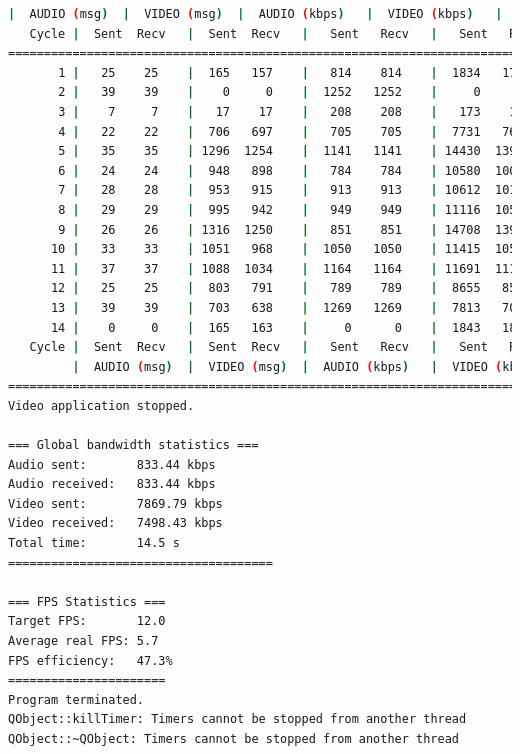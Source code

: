\begin{lstlisting}[language=bash,basicstyle=\ttfamily\tiny]
         |  AUDIO (msg)  |  VIDEO (msg)  |  AUDIO (kbps)   |  VIDEO (kbps)   |     CPU (%) 
   Cycle |  Sent  Recv   |  Sent  Recv   |   Sent   Recv   |   Sent   Recv   | Program System
================================================================================================
       1 |   25    25    |  165   157    |   814    814    |  1834   1747    |  30      0       
       2 |   39    39    |    0     0    |  1252   1252    |     0      0    |  31     80       
       3 |    7     7    |   17    17    |   208    208    |   173    173    |  30     28       
       4 |   22    22    |  706   697    |   705    705    |  7731   7634    |  27     77       
       5 |   35    35    | 1296  1254    |  1141   1141    | 14430  13964    |  55     72       
       6 |   24    24    |  948   898    |   784    784    | 10580  10023    |  31     77       
       7 |   28    28    |  953   915    |   913    913    | 10612  10186    |  33     80       
       8 |   29    29    |  995   942    |   949    949    | 11116  10523    |  43     75       
       9 |   26    26    | 1316  1250    |   851    851    | 14708  13969    |  31     76       
      10 |   33    33    | 1051   968    |  1050   1050    | 11415  10515    |  38     75       
      11 |   37    37    | 1088  1034    |  1164   1164    | 11691  11110    |  59     80       
      12 |   25    25    |  803   791    |   789    789    |  8655   8526    |  37     81       
      13 |   39    39    |  703   638    |  1269   1269    |  7813   7092    |  36     75       
      14 |    0     0    |  165   163    |     0      0    |  1843   1821    |   2     45       
   Cycle |  Sent  Recv   |  Sent  Recv   |   Sent   Recv   |   Sent   Recv   | Program System
         |  AUDIO (msg)  |  VIDEO (msg)  |  AUDIO (kbps)   |  VIDEO (kbps)   |     CPU (%) 
===========================================================================================
Video application stopped.

=== Global bandwidth statistics ===
Audio sent:       833.44 kbps
Audio received:   833.44 kbps
Video sent:       7869.79 kbps
Video received:   7498.43 kbps
Total time:       14.5 s
=====================================

=== FPS Statistics ===
Target FPS:       12.0
Average real FPS: 5.7
FPS efficiency:   47.3%
======================
Program terminated.
QObject::killTimer: Timers cannot be stopped from another thread
QObject::~QObject: Timers cannot be stopped from another thread
\end{lstlisting}
\vspace{\baselineskip}

